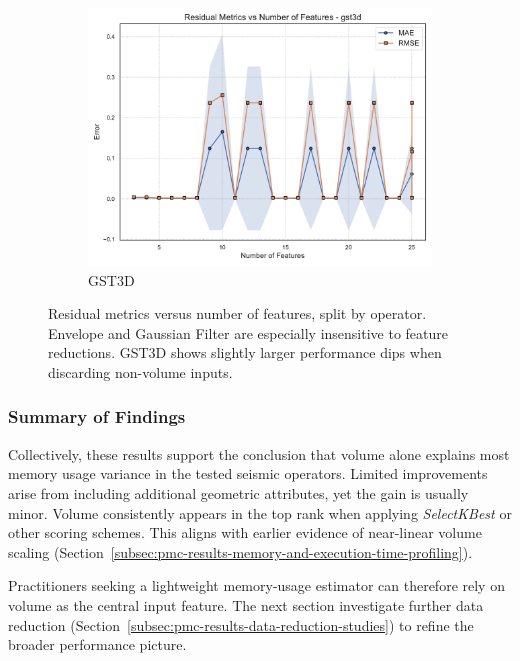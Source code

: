 \begin{figure}[htbp]
\begin{subfigure}[t]{0.32\textwidth}
        \includegraphics[width=\textwidth]{assets/images/05/residual_metrics_by_number_of_features_gst3d}
        \caption{\ac{GST3D}}
    \end{subfigure}
    \caption{Residual metrics versus number of features, split by operator.
    Envelope and Gaussian Filter are especially insensitive to feature reductions.
    \ac{GST3D} shows slightly larger performance dips when discarding non-volume inputs.}
    \label{fig:residual_metrics_by_number_of_features_operator_subplots}
\end{figure}

\subsubsection{Summary of Findings}
\label{subsec:feature-selection-summary}

Collectively, these results support the conclusion that volume alone explains most memory usage variance in the tested seismic operators.
Limited improvements arise from including additional geometric attributes, yet the gain is usually minor.
Volume consistently appears in the top rank when applying \emph{SelectKBest} or other scoring schemes.
This aligns with earlier evidence of near-linear volume scaling (Section~\ref{subsec:pmc-results-memory-and-execution-time-profiling}).

Practitioners seeking a lightweight memory-usage estimator can therefore rely on volume as the central input feature.
The next section investigate further data reduction (Section~\ref{subsec:pmc-results-data-reduction-studies}) to refine the broader performance picture.